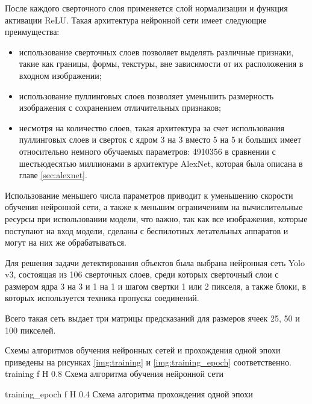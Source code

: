После каждого сверточного слоя применяется слой нормализации и функция активации ReLU. Такая архитектура нейронной сети имеет следующие преимущества:
\begin{itemize}
	\item использование сверточных слоев позволяет выделять различные признаки, такие как границы, формы, текстуры, вне зависимости от их расположения в входном изображении;
	\item использование пуллинговых слоев позволяет уменьшить размерность изображения с сохранением отличительных признаков;
	\item несмотря на количество слоев, такая архитектура за счет использования пуллинговых слоев и сверток с ядром 3 на 3 вместо 5 на 5 и больших имеет относительно немного обучаемых параметров: 4910356 в сравнении с шестьюдесятью миллионами в архитектуре AlexNet, которая была описана в главе \ref{sec:alexnet}.
\end{itemize}

Использование меньшего числа параметров приводит к уменьшению скорости обучения нейронной сети, а также к меньшим ограничениям на вычислительные ресурсы при использовании модели, что важно, так как все изображения, которые поступают на вход модели, сделаны с беспилотных летательных аппаратов и могут на них же обрабатываться.

Для решения задачи детектирования объектов была выбрана нейронная сеть Yolo v3, состоящая из 106 сверточных слоев, среди которых сверточный слои с размером ядра 3 на 3 и 1 на 1 и шагом свертки 1 или 2 пикселя, а также блоки, в которых используется техника пропуска соединений.

Всего такая сеть выдает три матрицы предсказаний для размеров ячеек 25, 50 и 100 пикселей.

Схемы алгоритмов обучения нейронных сетей и прохождения одной эпохи приведены на рисунках \ref{img:training} и \ref{img:training_epoch} соответственно.
{training} %
{f} %
{H} %
{0.8\textwidth} %
{Схема алгоритма обучения нейронной сети} %

{training_epoch} %
{f} %
{H} %
{0.4\textwidth} %
{Схема алгоритма прохождения одной эпохи} %

